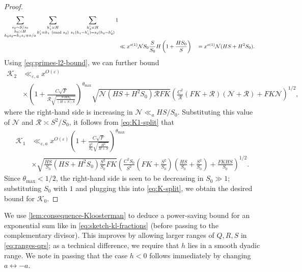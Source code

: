 \documentclass[reqno,11pt]{amsart}
\theoremstyle{remark}
\numberwithin{equation}{section}
\newcommand{\NN}{\mathcal{N}}
\newcommand{\RR}{\mathcal{R}}
\newcommand{\mK}{\mathcal{K}}
\newcommand{\eps}{\varepsilon}
\renewcommand{\pmod}[1]{\ (\textnormal{mod } #1)}
\begin{document}
\begin{proof}
\[\begin{aligned}
    \sum_{\substack{s_2 \sim S/s_0 \\ h_2 \asymp H \\ h_2 s_2 = h_1 s_1 \mp n/a}}
    \sum_{\substack{h_1' \asymp H \\ h_1' \equiv h_1 \pmod{s_2}}}\, 
    \sum_{\substack{h_2' \asymp H \\ s_1(h_1 - h_1') = s_2(h_2 - h_2')}} 1
    \\
    &\ll x^{o(1)}
    \NN S_0 \frac{S}{S_0} H \left(1 + \frac{H S_0}{S}\right)
    \quad 
    =
    x^{o(1)} \NN (HS + H^2 S_0).
\end{aligned}
\]
Using \cref{eq:primes-l2-bound}, we can further bound 
\[
\begin{aligned}
    \mK_2 &\ll_{\eps,a} x^{O(\eps)}
    \\
    &\times \left(1 + \frac{C\sqrt{F}}{\RR\sqrt{\frac{\NN H S_0}{(H+S)S}}}\right)^{\theta_{\max}} 
    \sqrt{\NN (HS + H^2 S_0) \RR F K}
    \left(\frac{C^2}{\RR}(FK + \RR)(\NN + \RR) + FK\NN\right)^{1/2},
\end{aligned}
\]
where the right-hand side is increasing in $\NN \ll_a HS/S_0$. Substituting this value of $\NN$ and $\RR \asymp S^2/S_0$, it follows from \cref{eq:K1-split} that
\[
\begin{aligned}
    \mK_1 
    &\ll_{\eps,a} 
    x^{O(\eps)}
    \left(1 + \frac{C\sqrt{F}}{\frac{S^2}{S_0}\sqrt{\frac{H^2}{H+S}}}\right)^{\theta_{\max}} 
    \\
    &\times
    \sqrt{\frac{HS}{S_0} (HS + H^2 S_0) \frac{S^2}{S_0} F K}
    \left(\frac{C^2 S_0}{S^2}\left(FK + \frac{S^2}{S_0}\right)\left(\frac{HS}{S_0} + \frac{S^2}{S_0}\right) + \frac{FKHS}{S_0}\right)^{1/2}.
\end{aligned}
\]
Since $\theta_{\max} < 1/2$, the right-hand side is seen to be decreasing in $S_0 \gg 1$; substituting $S_0$ with $1$ and plugging this into \cref{eq:K-split}, we obtain the desired bound for $\mK_0$.
\end{proof}

We use \cref{lem:consequence-Kloosterman} to deduce a power-saving bound for an exponential sum like in \cref{eq:sketch-kl-fractions} (before passing to the complementary divisor). This improves \cite[Lemma 7.1]{maynard2025primes2} by allowing larger ranges of $Q, R, S$ in \cref{eq:ranges-qrs}; as a technical difference, we require that $h$ lies in a smooth dyadic range. We note in passing that the case $h < 0$ follows immediately by changing $a \leftrightarrow -a$.
\end{document}
